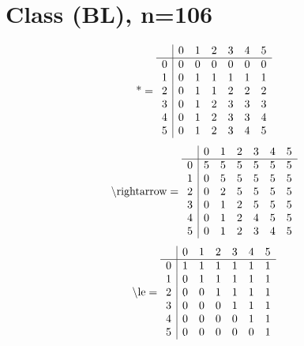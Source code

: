 \documentclass[11pt]{article}
\begin{document}
\section{Class (BL), n=106}
\[\text{*} = 
\begin{array}{r | r r r r r r}
 & 0 & 1 & 2 & 3 & 4 & 5 \\ \hline
0 & 0 & 0 & 0 & 0 & 0 & 0 \\
1 & 0 & 1 & 1 & 1 & 1 & 1 \\
2 & 0 & 1 & 1 & 2 & 2 & 2 \\
3 & 0 & 1 & 2 & 3 & 3 & 3 \\
4 & 0 & 1 & 2 & 3 & 3 & 4 \\
5 & 0 & 1 & 2 & 3 & 4 & 5 \\
\end{array}
\]
\[\text{\textbackslash rightarrow} = 
\begin{array}{r | r r r r r r}
 & 0 & 1 & 2 & 3 & 4 & 5 \\ \hline
0 & 5 & 5 & 5 & 5 & 5 & 5 \\
1 & 0 & 5 & 5 & 5 & 5 & 5 \\
2 & 0 & 2 & 5 & 5 & 5 & 5 \\
3 & 0 & 1 & 2 & 5 & 5 & 5 \\
4 & 0 & 1 & 2 & 4 & 5 & 5 \\
5 & 0 & 1 & 2 & 3 & 4 & 5 \\
\end{array}
\]
\[\text{\textbackslash le} = 
\begin{array}{r | r r r r r r}
 & 0 & 1 & 2 & 3 & 4 & 5 \\ \hline
0 & 1 & 1 & 1 & 1 & 1 & 1 \\
1 & 0 & 1 & 1 & 1 & 1 & 1 \\
2 & 0 & 0 & 1 & 1 & 1 & 1 \\
3 & 0 & 0 & 0 & 1 & 1 & 1 \\
4 & 0 & 0 & 0 & 0 & 1 & 1 \\
5 & 0 & 0 & 0 & 0 & 0 & 1 \\
\end{array}
\]
\end{document}
